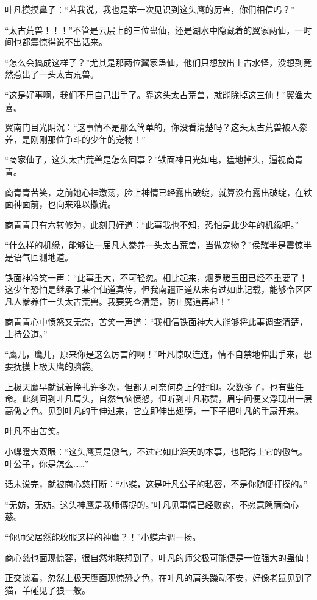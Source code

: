 \begin{this_body}
叶凡摸摸鼻子：“若我说，我也是第一次见识到这头鹰的厉害，你们相信吗？”

“太古荒兽！！！”不管是云层上的三位蛊仙，还是湖水中隐藏着的翼家两仙，一时间也都震惊得说不出话来。

“怎么会搞成这样子？”尤其是那两位翼家蛊仙，他们只想放出上古水怪，没想到竟然惹出了一头太古荒兽。

“这是好事啊，我们不用自己出手了。靠这头太古荒兽，就能除掉这三仙！”翼渔大喜。

翼南门目光阴沉：“这事情不是那么简单的，你没看清楚吗？这头太古荒兽被人豢养，是刚刚那位争斗的少年的宠物！”

“商家仙子，这头太古荒兽是怎么回事？”铁面神目光如电，猛地掉头，逼视商青青。

商青青苦笑，之前她心神激荡，脸上神情已经露出破绽，就算没有露出破绽，在铁面神面前，也向来难以撒谎。

商青青只有六转修为，此刻只好道：“此事我也不知，恐怕是此少年的机缘吧。”

“什么样的机缘，能够让一届凡人豢养一头太古荒兽，当做宠物？”侯耀半是震惊半是语气叵测地道。

铁面神冷笑一声：“此事重大，不可轻忽。相比起来，烟罗暖玉田已经不重要了！这少年恐怕是继承了某个仙道真传，但我南疆正道从未有过如此记载，能够令区区凡人豢养住一头太古荒兽。我要究查清楚，防止魔道再起！”

商青青心中愤怒又无奈，苦笑一声道：“我相信铁面神大人能够将此事调查清楚，主持公道。”

“鹰儿，鹰儿，原来你是这么厉害的啊！”叶凡惊叹连连，情不自禁地伸出手来，想要抚摸上极天鹰的脑袋。

上极天鹰早就试着挣扎许多次，但都无可奈何身上的封印。次数多了，也有些任命。此刻回到叶凡肩头，自然气恼愤怒，但听到叶凡称赞，眉宇间便又浮现出一层高傲之色。见到叶凡的手伸过来，它立即伸出翅膀，一下子把叶凡的手扇开来。

叶凡不由苦笑。

小蝶瞪大双眼：“这头鹰真是傲气，不过它如此滔天的本事，也配得上它的傲气。叶公子，你是怎么……”

话未说完，就被商心慈打断：“小蝶，这是叶凡公子的私密，不是你随便打探的。”

“无妨，无妨。这头神鹰是我师傅捉的。”叶凡见事情已经败露，不愿意隐瞒商心慈。

“你师父居然能收服这样的神鹰？！”小蝶声调一扬。

商心慈也面现惊容，很自然地联想到了，叶凡的师父极可能便是一位强大的蛊仙！

正交谈着，忽然上极天鹰面现惊恐之色，在叶凡的肩头躁动不安，好像老鼠见到了猫，羊碰见了狼一般。


\end{this_body}
